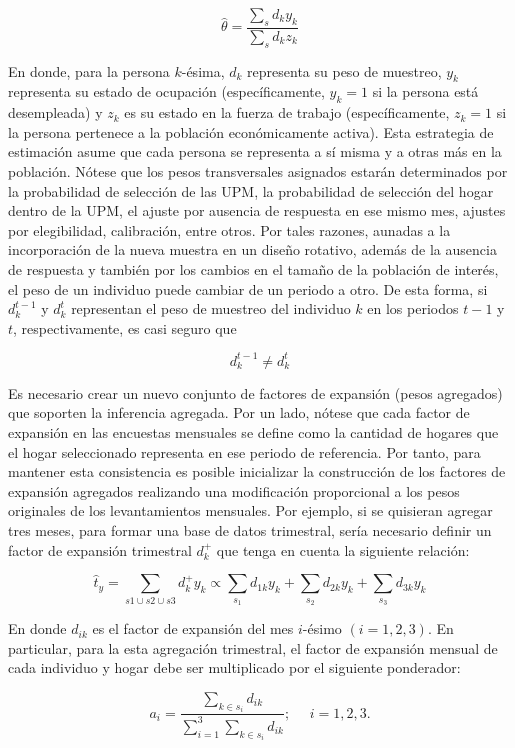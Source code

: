 \documentclass[
  12pt,
  spanish,
]{book}
\begin{document}
\[\hat\theta=\frac{\sum_s d_ky_k}{\sum_s d_kz_k}\]

En donde, para la persona \(k\)-ésima, \(d_k\) representa su peso de
muestreo, \(y_k\) representa su estado de ocupación (específicamente,
\(y_k=1\) si la persona está desempleada) y \(z_k\) es su estado en la
fuerza de trabajo (específicamente, \(z_k=1\) si la persona pertenece a la
población económicamente activa). Esta estrategia de estimación asume que cada persona
se representa a sí misma y a otras más en la población. Nótese que los
pesos transversales asignados estarán determinados por la probabilidad
de selección de las UPM, la probabilidad de selección del hogar dentro
de la UPM, el ajuste por ausencia de respuesta en ese mismo mes, ajustes
por elegibilidad, calibración, entre otros. Por tales razones, aunadas a
la incorporación de la nueva muestra en un diseño rotativo, además de la
ausencia de respuesta y también por los cambios en el tamaño de la
población de interés, el peso de un individuo puede cambiar de un
periodo a otro. De esta forma, si \(d_k^{t-1}\) y \(d_k^{t}\) representan el
peso de muestreo del individuo \(k\) en los periodos \(t-1\) y \(t\),
respectivamente, es casi seguro que

\[d_k^{t-1} \neq d_k^t\]

Es necesario crear un nuevo conjunto de factores de expansión (pesos
agregados) que soporten la inferencia agregada. Por un lado, nótese que cada factor de expansión en las encuestas mensuales se
define como la cantidad de hogares que el hogar seleccionado representa
en ese periodo de referencia. Por tanto, para mantener esta consistencia
es posible inicializar la construcción de los factores de expansión agregados realizando una modificación proporcional a los pesos originales de los levantamientos mensuales. Por ejemplo, si se quisieran agregar tres meses, para formar una base de datos trimestral, sería necesario definir un factor de expansión trimestral \(d_{k}^+\) que tenga en cuenta la siguiente relación:

\[
\hat{t}_y = \sum_{s1 \cup s2 \cup s3} d_{k}^+ y_k
\propto \sum_{s_1} d_{1k} y_k + \sum_{s_2} d_{2k} y_k + \sum_{s_3} d_{3k} y_k
\]

En donde \(d_{ik}\) es el factor de expansión del mes \(i\)-ésimo \((i = 1,2,3)\). En particular, para la esta agregación trimestral, el factor de expansión mensual de
cada individuo y hogar debe ser multiplicado por el siguiente
ponderador:

\[
a_i = \frac{\sum_{k\in s_i}d_{ik}}{\sum_{i=1}^{3}\sum_{k\in s_i}d_{ik}}; \ \ \ \ \ \ i= 1, 2 ,3.
\]
\end{document}
